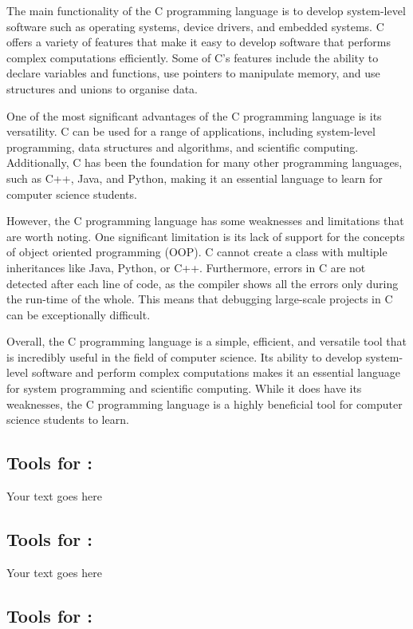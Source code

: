 \documentclass[a4paper, 11pt]{report}
\begin{document}
The main functionality of the C programming language is to develop system-level software such as operating systems, device drivers, and embedded systems. C offers a variety of features that make it easy to develop software that performs complex computations efficiently. Some of C's features include the ability to declare variables and functions, use pointers to manipulate memory, and use structures and unions to organise data.

One of the most significant advantages of the C programming language is its versatility. C can be used for a range of applications, including system-level programming, data structures and algorithms, and scientific computing. Additionally, C has been the foundation for many other programming languages, such as C++, Java, and Python, making it an essential language to learn for computer science students.

However, the C programming language has some weaknesses and limitations that are worth noting. One significant limitation is its lack of support for the concepts of object oriented programming (OOP). C cannot create a class with multiple inheritances like Java, Python, or C++. Furthermore, errors in C are not detected after each line of code, as the compiler shows all the errors only during the run-time of the whole. This means that debugging large-scale projects in C can be exceptionally difficult. \cite{c}

Overall, the C programming language is a simple, efficient, and versatile tool that is incredibly useful in the field of computer science. Its ability to develop system-level software and perform complex computations makes it an essential language for system programming and scientific computing. While it does have its weaknesses, the C programming language is a highly beneficial tool for computer science students to learn.

\subsection{Tools for \majB: \studB}

Your text goes here

\subsection{Tools for \majC: \studC}

Your text goes here

\subsection{Tools for \majD: \studD}
\end{document}
